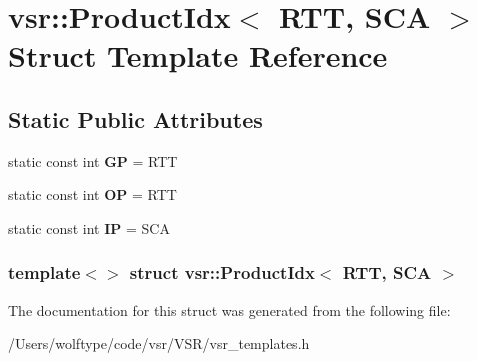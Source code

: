 \hypertarget{structvsr_1_1_product_idx_3_01_r_t_t_00_01_s_c_a_01_4}{\section{vsr\-:\-:Product\-Idx$<$ R\-T\-T, S\-C\-A $>$ Struct Template Reference}
\label{structvsr_1_1_product_idx_3_01_r_t_t_00_01_s_c_a_01_4}
}
\subsection*{Static Public Attributes}
\begin{DoxyCompactItemize}
\item 
\hypertarget{structvsr_1_1_product_idx_3_01_r_t_t_00_01_s_c_a_01_4_ab05569ddf9196a2c4e637ca911924b7b}{static const int {\bfseries G\-P} = R\-T\-T}\label{structvsr_1_1_product_idx_3_01_r_t_t_00_01_s_c_a_01_4_ab05569ddf9196a2c4e637ca911924b7b}

\item 
\hypertarget{structvsr_1_1_product_idx_3_01_r_t_t_00_01_s_c_a_01_4_ad6af30bfaa097fb97b354a9a075cf206}{static const int {\bfseries O\-P} = R\-T\-T}\label{structvsr_1_1_product_idx_3_01_r_t_t_00_01_s_c_a_01_4_ad6af30bfaa097fb97b354a9a075cf206}

\item 
\hypertarget{structvsr_1_1_product_idx_3_01_r_t_t_00_01_s_c_a_01_4_af2939459ed00fcd54370c275e6e19a18}{static const int {\bfseries I\-P} = S\-C\-A}\label{structvsr_1_1_product_idx_3_01_r_t_t_00_01_s_c_a_01_4_af2939459ed00fcd54370c275e6e19a18}

\end{DoxyCompactItemize}
\subsubsection*{template$<$$>$ struct vsr\-::\-Product\-Idx$<$ R\-T\-T, S\-C\-A $>$}



The documentation for this struct was generated from the following file\-:\begin{DoxyCompactItemize}
\item 
/\-Users/wolftype/code/vsr/\-V\-S\-R/vsr\-\_\-templates.\-h\end{DoxyCompactItemize}

